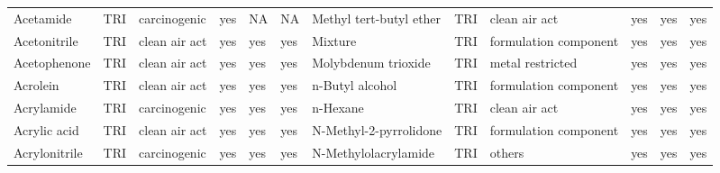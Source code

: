 \begin{table}[H]
{\begin{tabular}{llllllllllll}
            Acetamide                                                                  & TRI            & carcinogenic          & yes    & NA      & NA   & Methyl tert-butyl ether                                                                                            & TRI            & clean air act         & yes & yes & yes\\
            Acetonitrile                                                               & TRI            & clean air act         & yes    & yes     & yes  & Mixture                                                                                                            & TRI            & formulation component & yes & yes & yes\\
            Acetophenone                                                               & TRI            & clean air act         & yes    & yes     & yes  & Molybdenum trioxide                                                                                                & TRI            & metal restricted & yes & yes & yes\\
            Acrolein                                                                   & TRI            & clean air act         & yes    & yes     & yes  & n-Butyl alcohol                                                                                                    & TRI            & formulation component & yes & yes & yes\\
            Acrylamide                                                                 & TRI            & carcinogenic          & yes    & yes     & yes  & n-Hexane                                                                                                           & TRI            & clean air act         & yes    & yes     & yes  \\
            Acrylic acid                                                               & TRI            & clean air act         & yes    & yes     & yes  & N-Methyl-2-pyrrolidone                                                                                             & TRI            & formulation component & yes & yes & yes\\
            Acrylonitrile                                                              & TRI            & carcinogenic          & yes    & yes     & yes  & N-Methylolacrylamide                                                                                               & TRI            & others                & yes    & yes & yes\\

\end{tabular}}
\end{table}
